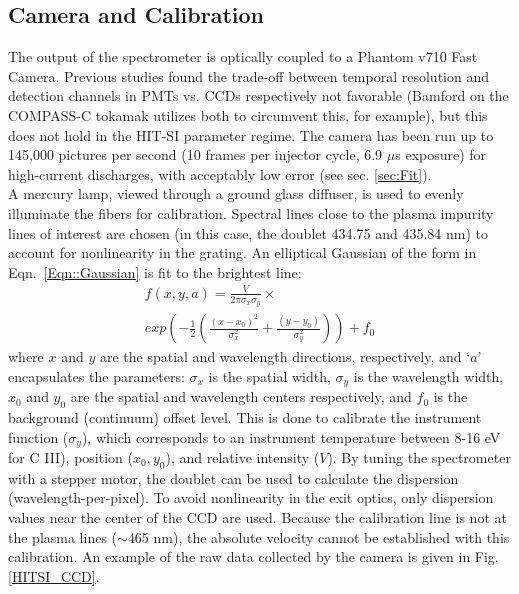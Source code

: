 \subsection{Camera and Calibration}
\hspace*{4ex}The output of the spectrometer is optically coupled to a Phantom v710 Fast Camera. Previous studies found the trade-off between temporal resolution and detection channels in PMTs vs. CCDs respectively not favorable (Bamford\cite{bamford1992combination} on the COMPASS-C tokamak  utilizes both to circumvent this, for example), but this does not hold in the HIT-SI parameter regime. The camera has been run up to 145,000 pictures per second (10 frames per injector cycle, 6.9 $\mu$s exposure) for high-current discharges, with acceptably low error (see sec. \ref{sec:Fit}). \\
\hspace*{4ex} A mercury lamp, viewed through a ground glass diffuser, is used to evenly illuminate the fibers for calibration. Spectral lines close to the plasma impurity lines of interest are chosen (in this case, the doublet 434.75 and 435.84 nm) to account for nonlinearity in the grating. An elliptical Gaussian of the form in Eqn.~\ref{Eqn::Gaussian} is fit to the brightest line:
\begin{eqnarray}\label{Eqn::Gaussian}
f(x,y,a)=\frac{V}{2{\pi}\sigma_x\sigma_y}\times\nonumber\\ exp\left(-\frac{1}{2}\left(\frac{(x-x_0)^2}{\sigma_x^2}+\frac{(y-y_0)}{\sigma_y^2}\right)\right)+f_0
\end{eqnarray}
where $x$ and $y$ are the spatial and wavelength directions, respectively, and `$a$' encapsulates the parameters: ${\sigma}_x$ is the spatial width, ${\sigma}_y$ is the wavelength width, $x_0$ and $y_0$ are the spatial and wavelength centers respectively, and $f_0$ is the background (continuum) offset level. This is done to calibrate the instrument function ($\sigma_y$), which corresponds to an instrument temperature between 8-16 eV for C III), position ($x_0,y_0$), and relative intensity ($V$). By tuning the spectrometer with a stepper motor, the doublet can be used to calculate the dispersion (wavelength-per-pixel). To avoid nonlinearity in the exit optics, only dispersion values near the center of the CCD are used.  Because the calibration line is not at the plasma lines ($\sim$465 nm), the absolute velocity cannot be established with this calibration. An example of the raw data collected by the camera is given in Fig. \ref{HITSI_CCD}.

